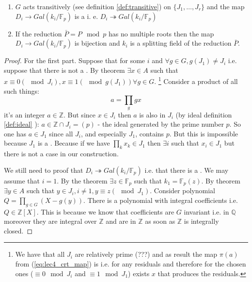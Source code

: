 \begin{theorem}
  \begin{enumerate}
  \item $G$ acts transitively (see definition \ref{def:transitive}) on
    $\{J_1, \dots, J_r\}$ and the map
    $D_i \to Gal\left(k_i/\mathbb{F}_p\right)$ is a
     i. e.
    $D_i \twoheadrightarrow Gal\left(k_i/\mathbb{F}_p\right)$
    \item If the reduction $\bar{P} = P \mod p$ has no multiple roots
      then the map $D_i \to Gal\left(k_i/\mathbb{F}_p\right)$ is
      bijection and $k_i$ is a splitting field of the reduction
      $\bar{P}$. 
  \end{enumerate}
  \begin{proof}
    For the first part. Suppose that for some $i$ and $\forall g \in G,
    g\left(J_1\right) \ne J_i$ i.e. suppose that there is not a
    . By 
    theorem $\exists x \in A$ such that
    $x \equiv 0 (\mod J_i),  x \equiv 1 (\mod g\left(J_1\right))
    \forall g \in G$.
    \footnote{
      We have that all $J_i$ are relatively prime (???) and as result
      the map $\pi\left(a\right)$ from (\ref{eq:lec4_crt_map}) is
      i.e. for any residuals and therefore for the chosen ones
      ($\equiv 0 \mod J_i$ and $\equiv 1 \mod J_1$) exists $x$ that
      produces the residuals. 
    }
    Consider a product of all such things:
    \[
    a = \prod_{g} g x
    \]
    it's an integer $a \in \mathbb{Z}$. But since $x \in J_i$ then $a$
    is also in $J_i$ (by ideal definition \ref{def:ideal} ):
    $a \in \mathbb{Z} \cap J_i = (p)$ - the ideal generated by the prime
    number $p$. So one has $a \in J_1$ since all $J_i$, and
    especially $J_1$, contains $p$. But this is impossible because
    $J_1$ is a . Because if we have
    $\prod_k x_k \in J_1$ then $\exists i$ such that $x_i \in J_1$ but
    there is not a case in our construction.

    We still need to proof that $D_i \twoheadrightarrow
    Gal\left(k_i/\mathbb{F}_p\right)$ i.e. that there is a
    . We may assume that $i=1$. By the
     theorem $\exists z \in
    \mathbb{F}_p$ such that $k_1 = \mathbb{F}_p\left(z\right)$. 
    By 
    theorem $\exists y \in A$ such that
    $y \in J_i, i \ne 1,  y \equiv z (\mod J_1)$. Consider polynomial
    $Q = \prod_{g \in G} \left(X - g\left(y\right)\right)$. There is a
    polynomial with integral coefficients i.e.
    $Q \in \mathbb{Z}\left[X\right]$. This is because we know that
    coefficients are $G$ invariant i.e. in $\mathbb{Q}$ moreover they
    are integral over $\mathbb{Z}$ and are in $\mathbb{Z}$ as soon as
    $\mathbb{Z}$ is integrally closed.


\end{proof}
\end{theorem}
